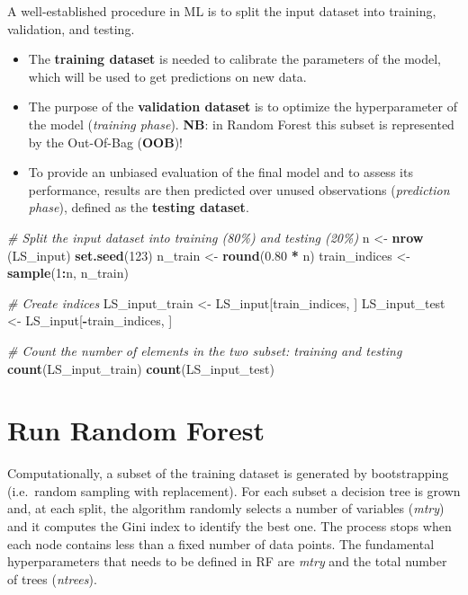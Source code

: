\documentclass[
]{book}
\newenvironment{Shaded}{\begin{snugshade}}{\end{snugshade}}
\newcommand{\CommentTok}[1]{\textcolor[rgb]{0.56,0.35,0.01}{\textit{#1}}}
\newcommand{\DecValTok}[1]{\textcolor[rgb]{0.00,0.00,0.81}{#1}}
\newcommand{\FloatTok}[1]{\textcolor[rgb]{0.00,0.00,0.81}{#1}}
\newcommand{\FunctionTok}[1]{\textcolor[rgb]{0.13,0.29,0.53}{\textbf{#1}}}
\newcommand{\NormalTok}[1]{#1}
\newcommand{\OtherTok}[1]{\textcolor[rgb]{0.56,0.35,0.01}{#1}}
\newcommand{\SpecialCharTok}[1]{\textcolor[rgb]{0.81,0.36,0.00}{\textbf{#1}}}
\begin{document}
A well-established procedure in ML is to split the input dataset into training, validation, and testing.

\begin{itemize}
\item
  The \textbf{training dataset} is needed to calibrate the parameters of the model, which will be used to get predictions on new data.
\item
  The purpose of the \textbf{validation dataset} is to optimize the hyperparameter of the model (\emph{training phase}).
  \textbf{NB}: in Random Forest this subset is represented by the Out-Of-Bag (\textbf{OOB})!
\item
  To provide an unbiased evaluation of the final model and to assess its performance, results are then predicted over unused observations (\emph{prediction phase}), defined as the \textbf{testing dataset}.
\end{itemize}

\begin{Shaded}
\begin{Highlighting}[]
\CommentTok{\# Split the input dataset into training (80\%) and testing (20\%)}
\NormalTok{n }\OtherTok{\textless{}{-}} \FunctionTok{nrow}\NormalTok{ (LS\_input)}
\FunctionTok{set.seed}\NormalTok{(}\DecValTok{123}\NormalTok{)}
\NormalTok{n\_train }\OtherTok{\textless{}{-}} \FunctionTok{round}\NormalTok{(}\FloatTok{0.80} \SpecialCharTok{*}\NormalTok{ n) }
\NormalTok{train\_indices }\OtherTok{\textless{}{-}} \FunctionTok{sample}\NormalTok{(}\DecValTok{1}\SpecialCharTok{:}\NormalTok{n, n\_train)}

\CommentTok{\# Create indices}
\NormalTok{LS\_input\_train }\OtherTok{\textless{}{-}}\NormalTok{ LS\_input[train\_indices, ]  }
\NormalTok{LS\_input\_test }\OtherTok{\textless{}{-}}\NormalTok{ LS\_input[}\SpecialCharTok{{-}}\NormalTok{train\_indices, ]}

\CommentTok{\# Count the number of elements in the two subset: training and testing}
\FunctionTok{count}\NormalTok{(LS\_input\_train)}
\FunctionTok{count}\NormalTok{(LS\_input\_test)}
\end{Highlighting}
\end{Shaded}

\hypertarget{run-random-forest}{%
\section{Run Random Forest}\label{run-random-forest}}

Computationally, a subset of the training dataset is generated by bootstrapping (i.e.~random sampling with replacement).
For each subset a decision tree is grown and, at each split, the algorithm randomly selects a number of variables (\emph{mtry}) and it computes the Gini index to identify the best one.
The process stops when each node contains less than a fixed number of data points.
The fundamental hyperparameters that needs to be defined in RF are \emph{mtry} and the total number of trees (\emph{ntrees}).
\end{document}
